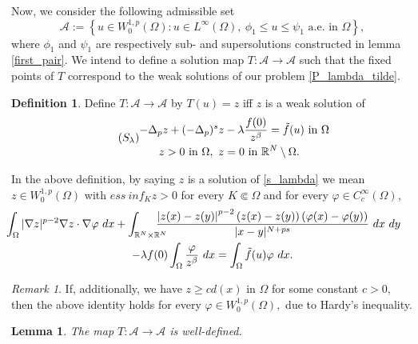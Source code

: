 \documentclass[reqno,oneside]{amsart}
\newtheorem{lemma}[theorem]{Lemma}
\theoremstyle{definition}
\newtheorem{definition}[theorem]{Definition}
\theoremstyle{remark}
\newtheorem{remark}[theorem]{Remark}
\numberwithin{equation}{section}
\newcommand{\p}{\Delta_p}
\newcommand{\ps}{(-\Delta_p)^s}
\newcommand{\la} {\lambda}
\newcommand{\ba}{\beta}
\newcommand{\Om} {\Omega}
\newcommand{\sr}{\mathbb{R}}
\newcommand{\rar}{\rightarrow}
\newcommand{\na} {\nabla}
\newcommand{\wop}{W^{1,p}_0 (\Omega)}
\newcommand{\test}{C_c^{\infty} (\Om)}
\newcommand{\bdry}{\mathbb{R}^N \setminus \Omega}
\begin{document}
Now, we consider the following admissible set
\[ \mathcal{A} := \left\{ u\in \wop : u \in L^{\infty} (\Om),\ \phi_1\leq u \leq \psi_1 \text{ a.e. in } \Om \right\}, \]
where $\phi_1$ and $\psi_1$ are respectively sub- and supersolutions constructed in lemma \ref{first_pair}. We intend to define a solution map $T: \mathcal{A} \rar \mathcal{A} $ such that the fixed points of $T$ correspond to the weak solutions of our problem \eqref{P_lambda_tilde}.
\begin{definition}
    Define $T: \mathcal{A} \rar \mathcal{A} $ by $T(u) = z$ iff $z$ is a weak solution of
    \begin{equation}\tag{$S_{\la}$}\label{s_lambda}
        \begin{aligned}
        -\p z + \ps z &-\la \frac{f(0)}{z^{\ba}} = \tilde{f}(u) \text{ in } \Om\\
        z >0 \text{ in } \Om,\ z &=0 \text{ in } \bdry.
    \end{aligned}
    \end{equation}
\end{definition}
In the above definition, by saying $z$ is a solution of \eqref{s_lambda} we mean $z\in \wop$ with $ess\ inf_K z >0$ for every $K\Subset\Om$ and for every $\varphi\in\test$,
\begin{multline*}
    \hspace{-16pt}\int_{\Om} |\na z|^{p-2} \na z \cdot \na\varphi\ dx + \int_{\sr^N \times \sr^N} \hspace{-12pt} \frac{\left|z(x) - z(y)\right|^{p-2} \left(z(x)-z(y)\right) \left(\varphi (x) - \varphi (y)\right)}{|x-y|^{N+ps}}\ dx\ dy\\
    - \la f(0) \int_{\Om} \frac{\varphi}{z^{\ba}}\ dx = \int_{\Om} \tilde{f}(u) \varphi\ dx.
\end{multline*}
\begin{remark}
    If, additionally, we have $z \geq cd(x)$ in $\Om$ for some constant $c>0$, then the above identity holds for every $\varphi\in\wop,$ due to Hardy's inequality.
\end{remark}    

\begin{lemma}\label{singular_welldefined}
    The map $T: \mathcal{A} \rar \mathcal{A}$ is well-defined.
\end{lemma}
\end{document}
